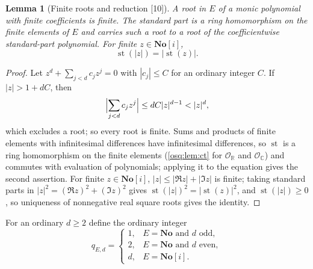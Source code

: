 \documentclass[11pt,letterpaper]{article}
\numberwithin{equation}{section}
\newtheorem{lemma}[lemma]{Lemma}
\theoremstyle{definition}
\theoremstyle{remark}
\theoremstyle{plain}
\newcommand{\No}{\mathbf{No}}
\newcommand{\SC}{\No[i]}
\newcommand{\R}{\mathbb R}
\newcommand{\C}{\mathbb C}
\newcommand{\OO}{\mathcal O}         %
\newcommand{\st}{\operatorname{st}}
\newcommand{\src}[1]{\textup{\textsf{[#1]}}}
\begin{document}
\begin{lemma}[Finite roots and reduction \src{10}]\label{osq:pm:lem:finiteroot}
A root in $E$ of a monic polynomial with finite coefficients is finite. The standard part
is a ring homomorphism on the finite elements of $E$ and carries such a root to a root of
the coefficientwise standard-part polynomial. For finite $z\in\SC$,
\[
 \st(|z|)=|\st(z)|.
\]
\end{lemma}
\begin{proof}
Let $z^d+\sum_{j<d}c_jz^j=0$ with $|c_j|\le C$ for an ordinary integer $C$. If
$|z|>1+dC$, then
\[
 \Bigl|\sum_{j<d}c_jz^j\Bigr|\le dC|z|^{d-1}<|z|^d,
\]
which excludes a root; so every root is finite. Sums and products of finite elements with
infinitesimal differences have infinitesimal differences, so $\st$ is a ring homomorphism
on the finite elements (\cref{osq:lem:ct} for $\OO_\R$ and $\OO_\C$) and commutes with
evaluation of polynomials; applying it to the equation gives the second assertion. For
finite $z\in\SC$, $|z|\le|\Re z|+|\Im z|$ is finite; taking standard parts in
$|z|^2=(\Re z)^2+(\Im z)^2$ gives $\st(|z|)^2=|\st(z)|^2$, and $\st(|z|)\ge0$, so
uniqueness of nonnegative real square roots gives the identity.
\end{proof}

For an ordinary $d\ge2$ define the ordinary integer
\begin{equation}\label{osq:pm:eq:qd}
 q_{E,d}=
 \begin{cases}
  1,&E=\No\text{ and }d\text{ odd},\\
  2,&E=\No\text{ and }d\text{ even},\\
  d,&E=\SC.
 \end{cases}
\end{equation}
\end{document}
